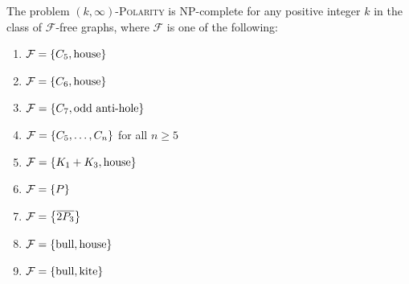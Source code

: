 \begin{corollary}
    The problem $(k,\infty)$-\textnormal{\scshape Polarity} is NP-complete for
    any positive integer $k$ in the class of $\mathcal{F}$-free graphs, where
    $\mathcal{F}$ is one of the following:
    \begin{enumerate}
        \item $\mathcal{F} = \left\{C_5,\text{house}\right\}$
        \item $\mathcal{F} = \left\{C_6,\text{house}\right\}$
        \item $\mathcal{F} = \left\{C_7,\text{odd anti-hole}\right\}$
        \item $\mathcal{F} = \left\{C_5,\dots,C_n\right\}$ for all $n\geq 5$
        \item $\mathcal{F} = \left\{K_1 + K_3, \text{house}\right\}$
        \item $\mathcal{F} = \left\{P\right\}$
        \item $\mathcal{F} = \left\{\overline{2P_3}\right\}$
        \item $\mathcal{F} = \left\{\text{bull},\text{house}\right\}$
        \item $\mathcal{F} = \left\{\text{bull},\text{kite}\right\}$
    \end{enumerate}
\end{corollary}